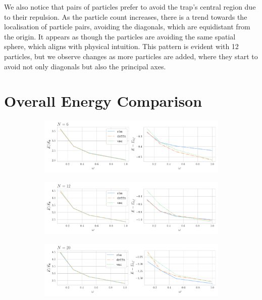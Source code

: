 We also notice that pairs of particles prefer to avoid the trap's central region due to their repulsion. As the particle count increases, there is a trend towards the localisation of particle pairs, avoiding the diagonals, which are equidistant from the origin. It appears as though the particles are avoiding the same spatial sphere, which aligns with physical intuition. This pattern is evident with 12 particles, but we observe changes as more particles are added, where they start to avoid not only diagonals but also the principal axes.

\section{Overall Energy Comparison}

\begin{figure}[H]
    \centering
    \begin{subfigure}{\textwidth}
        \centering
        \includegraphics[width=\textwidth]{Chapters/Results/dots/total_energy_vs_omega_n6.pdf}
        \vspace{-1.0cm}
    \end{subfigure}
    \begin{subfigure}{\textwidth}
        \centering
        \includegraphics[width=\textwidth]{Chapters/Results/dots/total_energy_vs_omega_n12.pdf}
        \vspace{-1.0cm}
    \end{subfigure}
    \begin{subfigure}{\textwidth}
        \centering
        \includegraphics[width=\textwidth]{Chapters/Results/dots/total_energy_vs_omega_n20.pdf}

\end{subfigure}
\end{figure}
